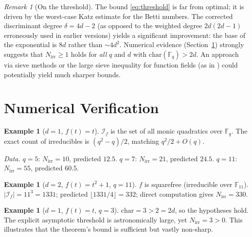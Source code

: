 \documentclass[11pt, a4paper]{article}
\theoremstyle{definition}
\newtheorem{example}[theorem]{Example}
\theoremstyle{remark}
\newtheorem{remark}[theorem]{Remark}
\newcommand{\Fq}{\mathbb{F}_q}
\begin{document}
\begin{remark}[On the threshold]\label{rem:threshold}
The bound \eqref{eq:threshold} is far from optimal;
it is driven by the worst-case Katz estimate for the Betti numbers.
The corrected discriminant degree $\delta = 4d - 2$ (as opposed to
the weighted degree $2d(2d-1)$ erroneously used in earlier versions)
yields a significant improvement: the base of the exponential is
$8d$ rather than $\sim 4d^2$.
Numerical evidence (Section~\ref{sec:numerical}) strongly suggests
that $N_{\mathrm{irr}} \ge 1$ holds for \emph{all} $q$ and $d$
with $\mathrm{char}(\Fq) > 2d$.
An approach via sieve methods or the large sieve inequality for
function fields (as in \cite{bank2015}) could potentially
yield much sharper bounds.
\end{remark}

\section{Numerical Verification}\label{sec:numerical}

\begin{example}[$d = 1$, $f(t) = t$]\label{ex:d1}
$\mathcal{I}_f$ is the set of all monic quadratics over $\Fq$.
The exact count of irreducibles is $(q^2-q)/2$,
matching $q^2/2 + O(q)$.

\smallskip
\noindent\textit{Data.}\;
$q = 5$: $N_{\mathrm{irr}} = 10$, predicted $12.5$.\quad
$q = 7$: $N_{\mathrm{irr}} = 21$, predicted $24.5$.\quad
$q = 11$: $N_{\mathrm{irr}} = 55$, predicted $60.5$.
\end{example}

\begin{example}[$d = 2$, $f(t) = t^2 + 1$, $q = 11$]
\label{ex:d2}
$f$ is squarefree (irreducible over $\mathbb{F}_{11}$).
$|\mathcal{I}_f| = 11^3 = 1331$;
predicted $\lfloor 1331/4 \rfloor = 332$;
direct computation gives $N_{\mathrm{irr}} = 330$.
\end{example}

\begin{example}[$d = 1$, $f(t) = t$, $q = 3$]
\label{ex:small}
$\mathrm{char} = 3 > 2 = 2d$, so the hypotheses hold.
The explicit asymptotic threshold is astronomically large,
yet $N_{\mathrm{irr}} = 3 > 0$.
This illustrates that the theorem's bound is sufficient
but vastly non-sharp.
\end{example}
\end{document}
